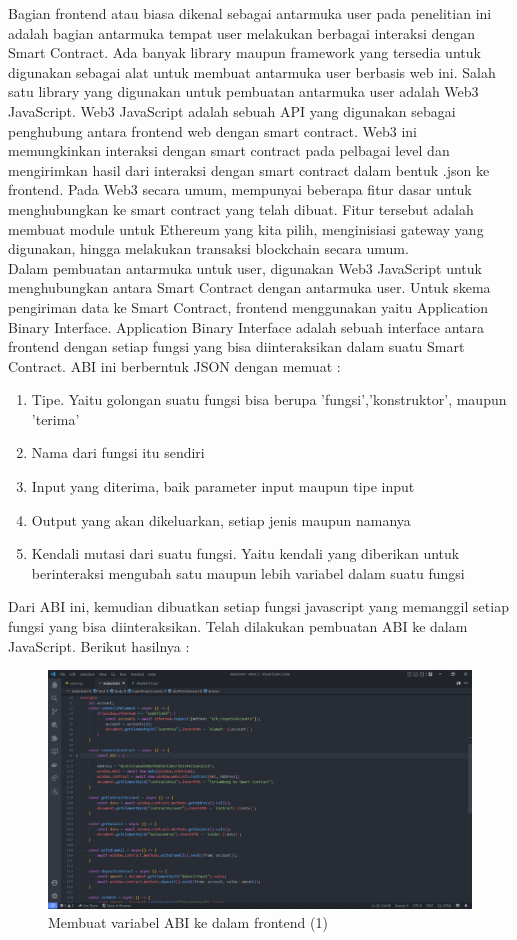 Bagian frontend atau biasa dikenal sebagai antarmuka user pada penelitian ini adalah bagian antarmuka tempat user melakukan berbagai interaksi dengan Smart Contract. Ada banyak library maupun framework yang tersedia untuk digunakan sebagai alat untuk membuat antarmuka user berbasis web ini. Salah satu library yang digunakan untuk pembuatan antarmuka user adalah Web3 JavaScript. Web3 JavaScript adalah sebuah API yang digunakan sebagai penghubung antara frontend web dengan smart contract. Web3 ini memungkinkan interaksi dengan smart contract pada pelbagai level dan mengirimkan hasil dari interaksi dengan smart contract dalam bentuk .json ke frontend. Pada Web3 secara umum, mempunyai beberapa fitur dasar untuk menghubungkan ke smart contract yang telah dibuat. Fitur tersebut adalah membuat module untuk Ethereum yang kita pilih, menginisiasi gateway yang digunakan, hingga melakukan transaksi blockchain secara umum.\\
Dalam pembuatan antarmuka untuk user, digunakan Web3 JavaScript untuk menghubungkan antara Smart Contract dengan antarmuka user. Untuk skema pengiriman data ke Smart Contract, frontend menggunakan yaitu Application Binary Interface. Application Binary Interface adalah sebuah interface antara frontend dengan setiap fungsi yang bisa diinteraksikan dalam suatu Smart Contract. ABI ini berberntuk JSON dengan memuat :
\begin{enumerate}
\item{Tipe. Yaitu golongan suatu fungsi bisa berupa 'fungsi','konstruktor', maupun 'terima'}
\item{Nama dari fungsi itu sendiri}
\item{Input yang diterima, baik parameter input maupun tipe input}
\item{Output yang akan dikeluarkan, setiap jenis maupun namanya}
\item{Kendali mutasi dari suatu fungsi. Yaitu kendali yang diberikan untuk berinteraksi mengubah satu maupun lebih variabel dalam suatu fungsi} 
\end{enumerate}
\newpage
Dari ABI ini, kemudian dibuatkan setiap fungsi javascript yang memanggil setiap fungsi yang bisa diinteraksikan. Telah dilakukan pembuatan ABI ke dalam JavaScript. Berikut hasilnya :
	
\begin{figure}[htp]
		\centering
		\includegraphics[scale=0.2]{gambar/bab3/front/1.png}
		\caption{Membuat variabel ABI ke dalam frontend (1)}
		\label{fig:abiready}
	\end{figure}

